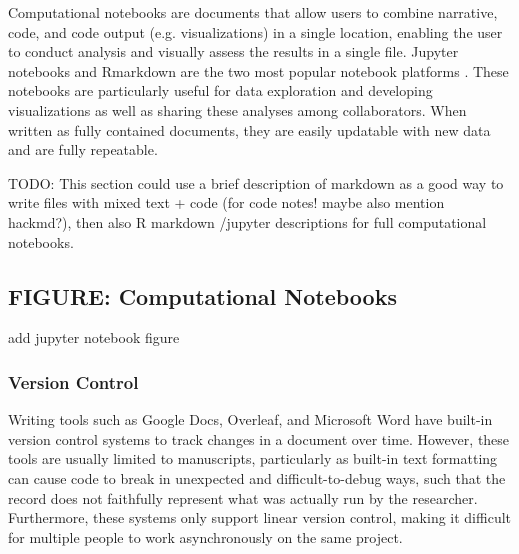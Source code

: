 \documentclass[10pt,letterpaper]{article}
\begin{document}
Computational notebooks are documents that allow users to combine narrative, code, and code output (e.g. visualizations) in a single location, enabling the user to conduct analysis and visually assess the results in a single file. Jupyter notebooks and Rmarkdown are the two most popular notebook platforms \cite{kluyver2016jupyter, allaire2018rmarkdown}. These notebooks are particularly useful for data exploration and developing visualizations as well as sharing these analyses among collaborators. When written as fully contained documents, they are easily updatable with new data and are fully repeatable. 

TODO: This section could use a brief description of markdown as a good way to write files with mixed text + code (for code notes! maybe also mention hackmd?), then also R markdown /jupyter descriptions for full computational notebooks. 

 
\begin{greybox}{\subsection*{FIGURE: Computational Notebooks}
add jupyter notebook figure
}
\end{greybox}

\subsubsection*{Version Control} 

Writing tools such as Google Docs, Overleaf, and Microsoft Word have built-in version control systems to track changes in a document over time. However, these tools are usually limited to manuscripts, particularly as built-in text formatting can cause code to break in unexpected and difficult-to-debug ways, such that the record does not faithfully represent what was actually run by the researcher. Furthermore, these systems only support linear version control, making it difficult for multiple people to work asynchronously on the same project. 
\end{document}
